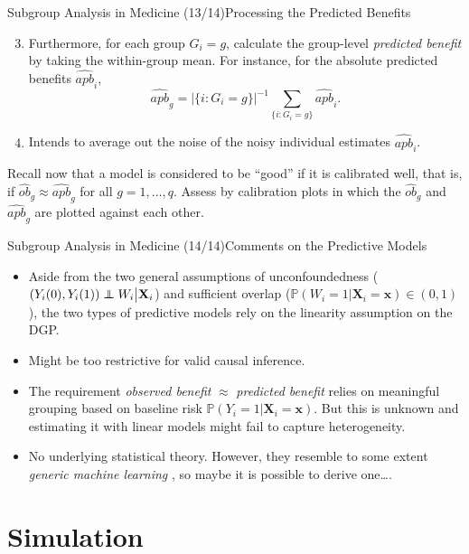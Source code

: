 \documentclass[11pt]{beamer}
\newcommand\independent{\protect\mathpalette{\protect\independenT}{\perp}}
\def\independenT#1#2{\mathrel{\rlap{$#1#2$}\mkern2mu{#1#2}}}
\begin{document}
\begin{frame}{Subgroup Analysis in Medicine (13/14)}{Processing the Predicted Benefits}
\begin{enumerate}
\setcounter{enumi}{2}
\item Furthermore, for each group $G_i = g$, calculate the group-level \textit{predicted benefit} by taking the within-group mean. For instance, for the absolute predicted benefits $\widehat{apb}_i$,
\[
	\widehat{apb}_g = |\{ i: G_i = g \}|^{-1} \sum_{\{i: G_i = g\}} \widehat{apb}_i.
\]
\item[\ding{212}] Intends to average out the noise of the noisy individual estimates $\widehat{apb}_i$.
\end{enumerate}
Recall now that a model is considered to be ``good'' if it is calibrated well, that is, if $\widehat{ob}_g \approx \widehat{apb}_g$ for all $g=1,\dots,q$. Assess by \alert{calibration plots} in which the $\widehat{ob}_g$ and $\widehat{apb}_g$ are plotted against each other.
\end{frame}


\begin{frame}{Subgroup Analysis in Medicine (14/14)}{Comments on the Predictive Models}
\begin{itemize}
\item Aside from the two general assumptions of unconfoundedness ($ (Y_i(0), Y_i(1))\independent W_i \big| \mathbf{X}_i$) and sufficient overlap ($\mathbb{P}(W_i = 1 | \mathbf{X}_i = \mathbf{x}) \in (0,1)$), the two types of predictive models rely on the linearity assumption on the DGP.
\item[\ding{212}] Might be too restrictive for valid causal inference.
\item The requirement \textit{observed benefit} $\approx$ \textit{predicted benefit} relies on meaningful grouping based on baseline risk $\mathbb{P}(Y_i = 1 | \mathbf{X}_i = \mathbf{x})$. But this is unknown and estimating it with linear models might fail to capture heterogeneity.
\item No underlying statistical theory. However, they resemble to some extent \textit{generic machine learning} \citep{chernozhukov2018generic}, so maybe it is possible to derive one\dots.
\end{itemize}
\end{frame}


\section{Simulation}
\end{document}
